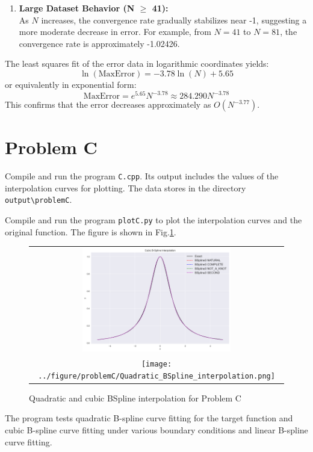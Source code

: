 \documentclass[a4paper]{article}
\begin{document}
\begin{sloppypar}
\begin{enumerate}
  \item \textbf{Large Dataset Behavior (N $\geq$ 41):} \\
        As \(N\) increases, the convergence rate gradually stabilizes near -1, suggesting a more moderate decrease in error. For example, from \(N=41\) to \(N=81\), the convergence rate is approximately -1.02426.
\end{enumerate}

The least squares fit of the error data in logarithmic coordinates yields:
\[
  \ln(\text{MaxError})=-3.78\ln(N)+5.65
\]
or equivalently in exponential form:
\[
  \text{MaxError} = e^{5.65}N^{-3.78} \approx 284.290N^{-3.78}
\]
This confirms that the error decreases approximately as \(O(N^{-3.77})\).

\section{Problem C}
Compile and run the program \verb|C.cpp|. Its output includes the values of the interpolation curves for plotting. The data stores in the directory \verb|output\problemC|.

Compile and run the program \verb|plotC.py| to plot the interpolation curves
and the original function. The figure is shown in
Fig.\ref{fig:BSpline_interpolation_C}.

\begin{figure}[H]
  \centering
  \begin{tabular}{c}
    \includegraphics[width=0.6\textwidth]{../figure/problemC/Cubic_BSpline_interpolation.png} \\
    \texttt{[image: ../figure/problemC/Quadratic\_BSpline\_interpolation.png]}
  \end{tabular}
  \renewcommand{\figurename}{Fig.}
  \caption{Quadratic and cubic BSpline interpolation for Problem C}
  \label{fig:BSpline_interpolation_C}
\end{figure}

The program tests quadratic B-spline curve fitting for the target function and
cubic B-spline curve fitting under various boundary conditions and linear
B-spline curve fitting.


\end{sloppypar}
\end{document}
